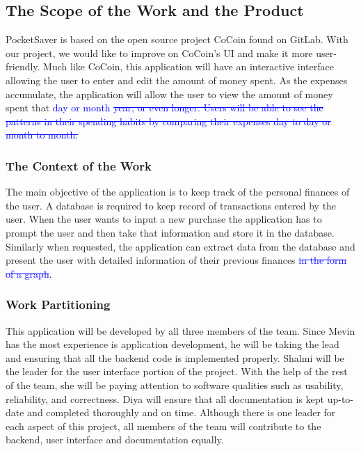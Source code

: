 \documentclass[12pt, titlepage]{article}
\begin{document}
\subsection{The Scope of the Work and the Product}
PocketSaver is based on the open source project CoCoin found on GitLab. With our project, we would like to improve on CoCoin's UI and make it more user-friendly. Much like CoCoin, this application will have an interactive interface allowing the user to enter and edit the amount of money spent. As the expenses accumulate, the application will allow the user to view the amount of money spent that \textcolor{blue}{ day or month} \textcolor{blue}{ \st{ year, or even longer. Users will be able to see the patterns in their spending habits by comparing their expenses day to day or month to month.}}

\subsubsection{The Context of the Work}
The main objective of the application is to keep track of the personal finances of the user. A database is required to keep record of transactions entered by the user. When the user wants to input a new purchase the application has to prompt the user and then take that information and store it in the database. Similarly when requested, the application can extract data from the database and present the user with detailed information of their previous finances \textcolor{blue}{ \st{in the form of a graph}}.

\subsubsection{Work Partitioning}
This application will be developed by all three members of the team. Since Mevin has the most experience is application development, he will be taking the lead and ensuring that all the backend code is implemented properly. Shalmi will be the leader for the user interface portion of the project. With the help of the rest of the team, she will be paying attention to software qualities such as usability, reliability, and correctness. Diya will ensure that all documentation is kept up-to-date and completed thoroughly and on time. Although there is one leader for each aspect of this project, all members of the team will contribute to the backend, user interface and documentation equally. 
\end{document}
